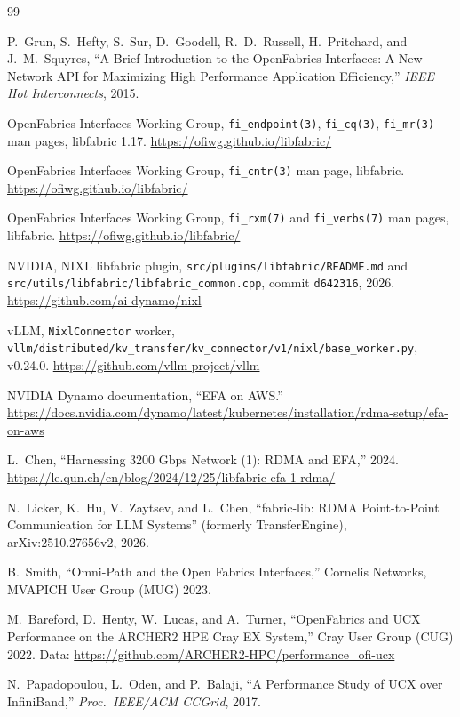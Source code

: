 \documentclass[11pt,letterpaper]{article}
\begin{document}
\begin{thebibliography}{99}\small

P.~Grun, S.~Hefty, S.~Sur, D.~Goodell, R.~D.~Russell, H.~Pritchard, and J.~M.~Squyres, ``A Brief Introduction to the OpenFabrics Interfaces: A New Network API for Maximizing High Performance Application Efficiency,'' \emph{IEEE Hot Interconnects}, 2015.

OpenFabrics Interfaces Working Group, \texttt{fi\_endpoint(3)}, \texttt{fi\_cq(3)}, \texttt{fi\_mr(3)} man pages, libfabric 1.17. \url{https://ofiwg.github.io/libfabric/}

OpenFabrics Interfaces Working Group, \texttt{fi\_cntr(3)} man page, libfabric. \url{https://ofiwg.github.io/libfabric/}

OpenFabrics Interfaces Working Group, \texttt{fi\_rxm(7)} and \texttt{fi\_verbs(7)} man pages, libfabric. \url{https://ofiwg.github.io/libfabric/}

NVIDIA, NIXL libfabric plugin, \nolinkurl{src/plugins/libfabric/README.md} and \nolinkurl{src/utils/libfabric/libfabric_common.cpp}, commit \texttt{d642316}, 2026. \url{https://github.com/ai-dynamo/nixl}

vLLM, \texttt{NixlConnector} worker, \nolinkurl{vllm/distributed/kv_transfer/kv_connector/v1/nixl/base_worker.py}, v0.24.0. \url{https://github.com/vllm-project/vllm}

NVIDIA Dynamo documentation, ``EFA on AWS.'' \url{https://docs.nvidia.com/dynamo/latest/kubernetes/installation/rdma-setup/efa-on-aws}

L.~Chen, ``Harnessing 3200 Gbps Network (1): RDMA and EFA,'' 2024. \url{https://le.qun.ch/en/blog/2024/12/25/libfabric-efa-1-rdma/}

N.~Licker, K.~Hu, V.~Zaytsev, and L.~Chen, ``fabric-lib: RDMA Point-to-Point Communication for LLM Systems'' (formerly TransferEngine), arXiv:2510.27656v2, 2026.

B.~Smith, ``Omni-Path and the Open Fabrics Interfaces,'' Cornelis Networks, MVAPICH User Group (MUG) 2023.

M.~Bareford, D.~Henty, W.~Lucas, and A.~Turner, ``OpenFabrics and UCX Performance on the ARCHER2 HPE Cray EX System,'' Cray User Group (CUG) 2022. Data: \url{https://github.com/ARCHER2-HPC/performance_ofi-ucx}

N.~Papadopoulou, L.~Oden, and P.~Balaji, ``A Performance Study of UCX over InfiniBand,'' \emph{Proc.\ IEEE/ACM CCGrid}, 2017.

\end{thebibliography}
\end{document}
